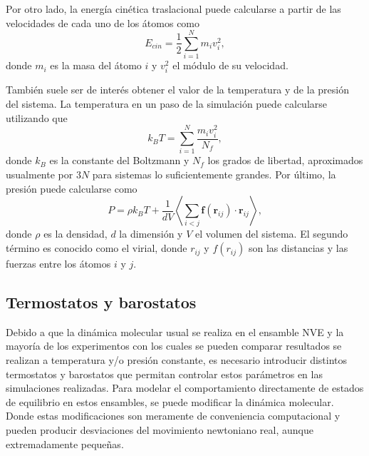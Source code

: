 Por otro lado, la energía cinética traslacional puede calcularse a partir de las
velocidades de cada uno de los átomos como
\begin{equation*}
E_{cin} = \frac{1}{2} \sum_{i=1}^{N} m_i v_i^2, 
\end{equation*}
donde $m_i$ es la masa del átomo $i$ y $v_i^2$ el módulo de su velocidad. 

También suele ser de interés obtener el valor de la temperatura y de la presión
del sistema. La temperatura en un paso de la simulación puede calcularse 
utilizando que
\begin{equation}\label{eq:tempvel}
    k_B T = \sum_{i=1}^N \frac{m_i v_i^2}{N_f},
\end{equation}
donde $k_B$ es la constante del Boltzmann y $N_f$ los grados de libertad,
aproximados usualmente por $3N$ para sistemas lo suficientemente grandes. Por 
último, la presión puede calcularse como 
\begin{equation*}
P = \rho k_B T + \frac{1}{d V} \left\langle \sum_{i<j} \mathbf{f}(\mathbf{r}_{ij}) \cdot \mathbf{r}_{ij} \right\rangle,
\end{equation*}
donde $\rho$ es la densidad, $d$ la dimensión y $V$ el volumen del sistema. El
segundo término es conocido como el virial, donde $r_{ij}$ y $f(r_{ij})$ son las 
distancias y las fuerzas entre los átomos $i$ y $j$.

\subsection{Termostatos y barostatos}

Debido a que la dinámica molecular usual se realiza en el ensamble NVE y la 
mayoría de los experimentos con los cuales se pueden comparar resultados se 
realizan a temperatura y/o presión constante, es necesario introducir distintos
termostatos y barostatos que permitan controlar estos parámetros en las 
simulaciones realizadas. Para modelar el comportamiento directamente de estados
de equilibrio en estos ensambles, se puede modificar la dinámica molecular. Donde
estas modificaciones son meramente de conveniencia computacional y pueden producir 
desviaciones del movimiento newtoniano real, aunque extremadamente pequeñas.

